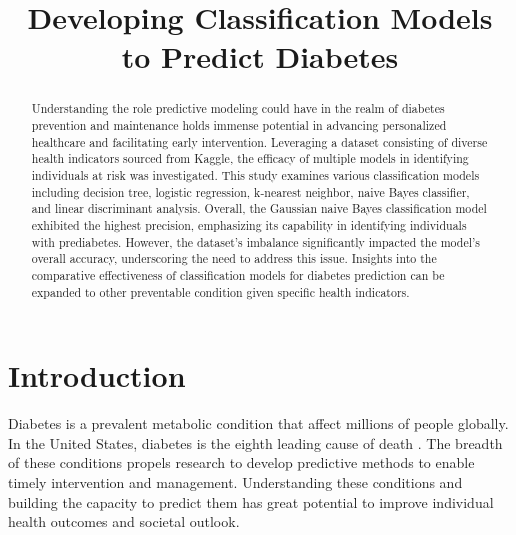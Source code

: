 \documentclass[journal]{IEEEtran}
\begin{document}
\setlength{\emergencystretch}{12pt}
\setlength{\parindent}{10pt}



\lstset{style=mystyle}

\title{Developing Classification Models to Predict Diabetes}

\author{
}

\maketitle

\begin{abstract}
\label{log:abstract}
Understanding the role predictive modeling could have in the realm of diabetes prevention and maintenance holds immense potential in advancing personalized healthcare and facilitating early intervention. Leveraging a dataset consisting of diverse health indicators sourced from Kaggle, the efficacy of multiple models in identifying individuals at risk was investigated. This study examines various classification models including decision tree, logistic regression, k-nearest neighbor, naive Bayes classifier, and linear discriminant analysis. Overall, the Gaussian naive Bayes classification model exhibited the highest precision, emphasizing its capability in identifying individuals with prediabetes. However, the dataset's imbalance significantly impacted the model's overall accuracy, underscoring the need to address this issue. Insights into the comparative effectiveness of classification models for diabetes prediction can be expanded to other preventable condition given specific health indicators. 
\end{abstract}

\section{Introduction}
Diabetes is a prevalent metabolic condition that affect millions of people globally. In the United States, diabetes is the eighth leading cause of death \cite{b1}. The breadth of these conditions propels research to develop predictive methods to enable timely intervention and management. Understanding these conditions and building the capacity to predict them has great potential to improve individual health outcomes and societal outlook.
\end{document}
